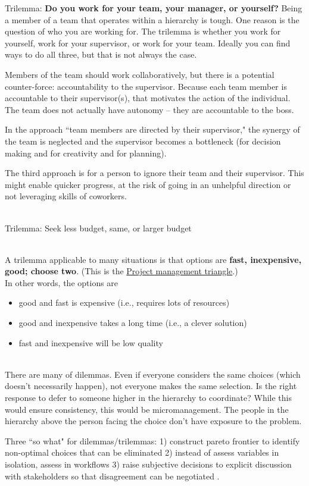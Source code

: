 Trilemma: \textbf{Do you work for your team, your manager, or yourself?}
Being a member of a team that operates within a hierarchy is tough. One reason is the question of who you are working for. The trilemma is whether you work for yourself, work for your supervisor, or work for your team.  Ideally you can find ways to do all three, but that is not always the case. 

Members of the team should work collaboratively, but there is a potential counter-force: accountability to the supervisor. Because each team member is accountable to their supervisor(s), that motivates the action of the individual. The team does not actually have autonomy -- they are accountable to the boss.

In the approach ``team members are directed by their supervisor," the synergy of the team is neglected and the supervisor becomes a bottleneck (for decision making and for creativity and for planning).

The third approach is for a person to ignore their team and their supervisor. This might enable quicker progress, at the risk of going in an unhelpful direction or not leveraging skills of coworkers. 

\ \\

Trilemma:
Seek less budget, same, or larger budget 

\ \\

A trilemma applicable to many situations is that options are \textbf{fast, inexpensive, good; choose two}. (This is the \href{https://en.wikipedia.org/wiki/Project_management_triangle}{Project management triangle}.) \\
In other words, the options are
\begin{itemize}
    \item good and fast is expensive (i.e., requires lots of resources)
    \item good and inexpensive takes a long time (i.e., a clever solution)
    \item fast and inexpensive will be low quality
\end{itemize}

\ \\

There are many of dilemmas. Even if everyone considers the same choices (which doesn't necessarily happen), not everyone makes the same selection. Is the right response to defer to someone higher in the hierarchy to coordinate? While this would ensure consistency, this would be micromanagement. The people in the hierarchy above the person facing the choice don't have exposure to the problem.


Three ``so what" for dilemmas/trilemmas:
1) construct pareto frontier to identify non-optimal choices that can be eliminated
2) instead of assess variables in isolation, assess in workflows
3) raise subjective decisions to explicit discussion with stakeholders so that disagreement can be negotiated .


